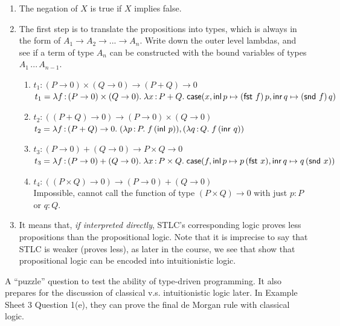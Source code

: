 \documentclass[11pt,a4paper,twoside]{article}
\begin{document}
\begin{enumerate}[label=(\alph*)]
  \item The negation of $X$ is true if $X$ implies false.
  \item The first step is to translate the propositions into types, which is always
    in the form of $A_1 \to A_2 \to ... \to A_n$. Write down the outer level lambdas,
    and see if a term of type $A_n$ can be constructed with the bound variables of types
    $A_1\, ...\, A_{n-1}$.

    \begin{enumerate}[label=(\roman*)]
      \item $t_1 : (P \to 0) \times (Q \to 0) \to (P + Q) \to 0$\\
        $ t_1 = 
        \lam{f}{(P \to 0) \times (Q \to 0)}{
          \lam{x}{P + Q}{
            \case{x}{p}{q}{\app{(\fst\ f)}{p}}{\app{(\snd\ f)}{q}}
          }
        }$
      \item $t_2 : ((P + Q) \to 0) \to (P \to 0) \times (Q \to 0)$\\
        $ t_2 = 
        \lambda f \,{:}\, (P + Q) \to 0 .\; 
          (\lambda p \,{:}\, P .\; f \, (\mathsf{inl}\ p)),
          (\lambda q \,{:}\, Q .\; f \, (\mathsf{inr}\ q))$
      \item $t_3 : (P \to 0) + (Q \to 0) \to P \times Q \to 0$\\
        $ t_3 = 
          \lam{f}{(P \to 0) + (Q \to 0)}{
            \lam{x}{P \times Q}{
              \case{f}{p}{q}{\app{p}{(\fst\ x)}}{\app{q}{(\snd\ x)}}
            }
          }$
      \item $t_4 : ((P \times Q) \to 0) \to (P \to 0) + (Q \to 0)$\\
        Impossible, cannot call the function of type $(P \times Q) \to 0$
        with just $p : P$ or $q : Q$.
    \end{enumerate}
  
  \item It means that, \emph{if interpreted directly}, STLC's corresponding logic proves
    less propositions than the propositional logic. Note that it is imprecise to say
    that STLC is weaker (proves less), as later in the course, we see that 
    show that propositional logic can be encoded into intuitionistic logic.
  
\end{enumerate}
%
A ``puzzle'' question to test the ability of type-driven programming.
It also prepares for the discussion of classical v.s. intuitionistic logic later.
In Example Sheet 3 Question 1(e), they can prove the final de Morgan rule with
classical logic.
\end{document}
